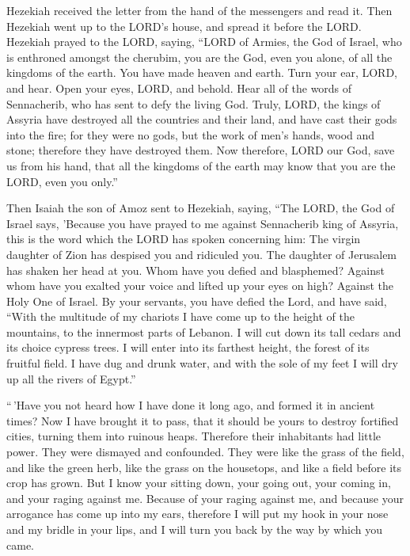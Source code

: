  Hezekiah received the letter from the hand of the
messengers and read it. Then Hezekiah went up to the LORD's house, and
spread it before the LORD.  Hezekiah prayed to the LORD,
saying,  ``LORD of Armies, the God of Israel, who is
enthroned amongst the cherubim, you are the God, even you alone, of all
the kingdoms of the earth. You have made heaven and earth.
 Turn your ear, LORD, and hear. Open your eyes, LORD, and
behold. Hear all of the words of Sennacherib, who has sent to defy the
living God.  Truly, LORD, the kings of Assyria have
destroyed all the countries and their land,  and have
cast their gods into the fire; for they were no gods, but the work of
men's hands, wood and stone; therefore they have destroyed them.
 Now therefore, LORD our God, save us from his hand, that
all the kingdoms of the earth may know that you are the LORD, even you
only.''

 Then Isaiah the son of Amoz sent to Hezekiah, saying,
``The LORD, the God of Israel says, 'Because you have prayed to me
against Sennacherib king of Assyria,  this is the word
which the LORD has spoken concerning him: The virgin daughter of Zion
has despised you and ridiculed you. The daughter of Jerusalem has shaken
her head at you.  Whom have you defied and blasphemed?
Against whom have you exalted your voice and lifted up your eyes on
high? Against the Holy One of Israel.  By your servants,
you have defied the Lord, and have said, ``With the multitude of my
chariots I have come up to the height of the mountains, to the innermost
parts of Lebanon. I will cut down its tall cedars and its choice cypress
trees. I will enter into its farthest height, the forest of its fruitful
field.  I have dug and drunk water, and with the sole of
my feet I will dry up all the rivers of Egypt.''

 ``\,'Have you not heard how I have done it long ago, and
formed it in ancient times? Now I have brought it to pass, that it
should be yours to destroy fortified cities, turning them into ruinous
heaps.  Therefore their inhabitants had little power.
They were dismayed and confounded. They were like the grass of the
field, and like the green herb, like the grass on the housetops, and
like a field before its crop has grown.  But I know your
sitting down, your going out, your coming in, and your raging against
me.  Because of your raging against me, and because your
arrogance has come up into my ears, therefore I will put my hook in your
nose and my bridle in your lips, and I will turn you back by the way by
which you came.

